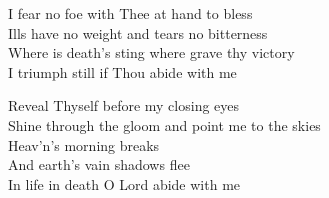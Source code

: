 \documentclass{beamer}
\begin{document}
{\begin{frame}{}
\end{frame}

\hypertarget{Abide with me[]4}{}
\begin{frame}{}
\fontsize{ 15 }{ 19 }\selectfont

I fear no foe with Thee at hand to bless\\ 
Ills have no weight and tears no bitterness\\ 
Where is death's sting where grave thy victory\\ 
I triumph still if Thou abide with me 

\end{frame}

\hypertarget{Abide with me[]5}{}
\begin{frame}{}
\fontsize{ 15 }{ 19 }\selectfont

Reveal Thyself before my closing eyes\\ 
Shine through the gloom and point me to the skies\\ 
Heav'n's morning breaks\\ 
And earth's vain shadows flee\\ 
In life in death O Lord abide with me 

\end{frame}

}
\end{document}

